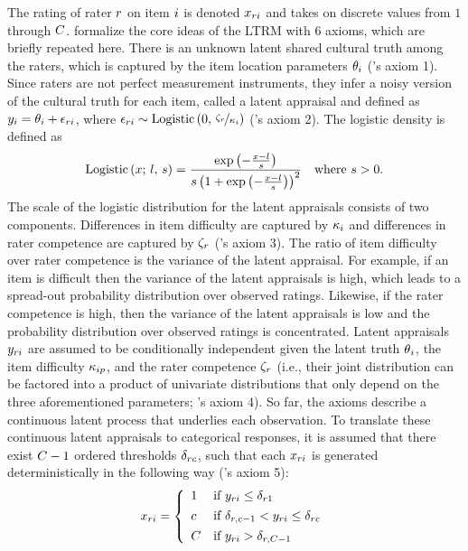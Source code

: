 \documentclass[a4paper,usenames,dvipsnames]{article}
\begin{document}
The rating of rater $r$ on item $i$ is denoted $x_{ri}$ and takes on discrete values from $1$ through $\Tncat$. \AB{} formalize the core ideas of the LTRM with 6 axioms, which are briefly repeated here. There is an unknown latent shared cultural truth among the raters, which is captured by the item location parameters $\theta_i$ (\AB{}'s axiom 1). Since raters are not perfect measurement instruments, they infer a noisy version of the cultural truth for each item, called a latent appraisal and defined as $y_{i} = \theta_i + \epsilon_{ri}$, where $\epsilon_{ri}\sim \text{Logistic}\left(0,\,\nicefrac{\zeta_r}{\kappa_i}\right)$ (\AB{}'s axiom 2). The logistic density is defined as
\begin{align*}
	\text{Logistic}\left(x;\,l,\,s\right) = \frac{\exp\left(-\frac{x - l}{s}\right)}{s\left(1 + \exp\left(-\frac{x - l}{s}\right)\right)^2}
	\quad \text{where $s > 0$}.
\end{align*}
The scale of the logistic distribution for the latent appraisals consists of two components. Differences in item difficulty are captured by $\kappa_i$ and differences in rater competence are captured by $\zeta_r$ (\AB{}'s axiom 3). The ratio of item difficulty over rater competence is the variance of the latent appraisal. For example, if an item is difficult then the variance of the latent appraisals is high, which leads to a spread-out probability distribution over observed ratings. Likewise, if the rater competence is high, then the variance of the latent appraisals is low and the probability distribution over observed ratings is concentrated. Latent appraisals $y_{ri}$ are assumed to be conditionally independent given the latent truth $\theta{}_i$, the item difficulty $\kappa_{ip}$, and the rater competence $\zeta_r$ (i.e., their joint distribution can be factored into a product of univariate distributions that only depend on the three aforementioned parameters; \AB{}'s axiom 4). So far, the axioms describe a continuous latent process that underlies each observation. To translate these continuous latent appraisals to categorical responses, it is assumed that there exist $\Tncat - 1$ ordered thresholds $\delta_{rc}$, such that each $x_{ri}$ is generated deterministically in the following way (\AB{}'s axiom 5):
\begin{align*}
	x_{\Irater\Iitem} =
	\left\{\begin{array}{ll}
	1		& \text{if }  \Appraisal_{\Irater\Iitem} \leq \Threshold_{\Irater 1} \\[4pt]
	\Incat	& \text{if }  \Threshold_{\Irater, \Incat-1} <  \Appraisal_{\Irater\Iitem} \leq \Threshold_{\Irater\Incat} \\[4pt]
	\Tncat	& \text{if }  \Appraisal_{\Irater\Iitem} > \Threshold_{\Irater, \Tncat-1}
	\end{array} \right.
\end{align*}
\end{document}
